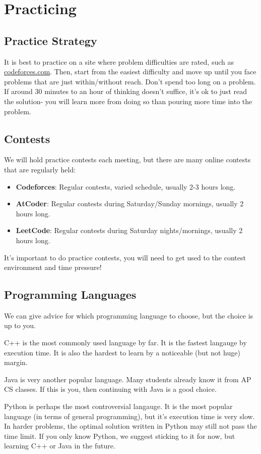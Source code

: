 \documentclass{article}
\begin{document}
\section{Practicing}
\subsection{Practice Strategy}
It is best to practice on a site where problem difficulties are rated, such as \url{codeforces.com}. Then, start from the easiest difficulty and move up until you face problems that are just within/without reach. Don't spend too long on a problem. If around 30 minutes to an hour of thinking doesn't suffice, it's ok to just read the solution- you will learn more from doing so than pouring more time into the problem.
\subsection{Contests}
We will hold practice contests each meeting, but there are many online contests that are regularly held:
\begin{itemize}
    \item \textbf{Codeforces}: Regular contests, varied schedule, usually 2-3 hours long.
    \item \textbf{AtCoder}: Regular contests during Saturday/Sunday mornings, usually 2 hours long.
    \item \textbf{LeetCode}: Regular contests during Saturday nights/mornings, usually 2 hours long.
\end{itemize}
It's important to do practice contests, you will need to get used to the contest environment and time pressure!
\subsection{Programming Languages}
We can give advice for which programming language to choose, but the choice is up to you.

C++ is the most commonly used language by far. It is the fastest langauge by execution time. It is also the hardest to learn by a noticeable (but not huge) margin.

Java is very another popular language. Many students already know it from AP CS classes. If this is you, then continuing with Java is a good choice.

Python is perhaps the most controversial langauge. It is the most popular language (in terms of general programming), but it's execution time is very slow. In harder problems, the optimal solution written in Python may still not pass the time limit. If you only know Python, we suggest sticking to it for now, but learning C++ or Java in the future.
\end{document}
